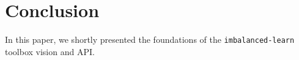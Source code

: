 \documentclass[twoside,11pt]{article}
\begin{document}

\section{Conclusion}

In this paper, we shortly presented the foundations of the \texttt{imbalanced-learn} toolbox vision and API.



\end{document}
